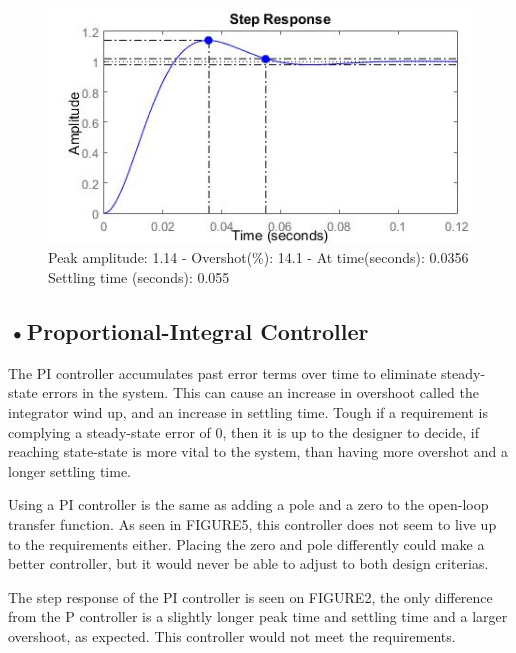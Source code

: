 \begin{figure}[h!]
\centering
\includegraphics[scale=0.7]{Billeder/PStep.jpg}
\caption{ Peak amplitude: 1.14 - Overshot(\%): 14.1 - At time(seconds): 0.0356
		 Settling time (seconds): 0.055 }
\label{fig:PStep}
\end{figure}

\subsection{•Proportional-Integral Controller}

The PI controller accumulates past error terms over time to eliminate steady-state errors in the system. This can cause an increase in overshoot called the integrator wind up, and an increase in settling time. Tough if a requirement is complying a steady-state error of 0, then it is up to the designer to decide, if reaching state-state is more vital to the system, than having more overshot and a longer settling time.\par

Using a PI controller is the same as adding a pole and a zero to the open-loop transfer function. As seen in FIGURE5, this controller does not seem to live up to the requirements either. Placing the zero and pole differently could make a better controller, but it would never be able to adjust to both design criterias.\par

The step response of the PI controller is seen on FIGURE2, the only difference from the P controller is a slightly longer peak time and settling time and a larger overshoot, as expected. This controller would not meet the requirements. 






























